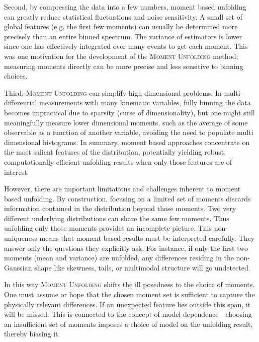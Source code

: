 {{        Second, by compressing the data into a few numbers, moment based unfolding can greatly reduce statistical fluctuations and noise sensitivity.
        A small set of global features (e.g. the first few moments) can usually be determined more precisely than an entire binned spectrum.
        The variance of estimators is lower since one has effectively integrated over many events to get each moment.
        This was one motivation for the development of the \textsc{Moment Unfolding} method;
        measuring moments directly can be more precise and less sensitive to binning choices.
        
        Third, \textsc{Moment Unfolding} can simplify high dimensional problems.
        In multi-differential measurements with many kinematic variables, fully binning the data becomes impractical due to sparsity (curse of dimensionality), but one might still meaningfully measure lower dimensional moments, such as the average of some observable as a function of another variable, avoiding the need to populate multi dimensional histograms.
        In summary, moment based approaches concentrate on the most salient features of the distribution, potentially yielding robust, computationally efficient unfolding results when only those features are of interest.

        However, there are important limitations and challenges inherent to moment based unfolding.
        By construction, focusing on a limited set of moments discards information contained in the distribution beyond those moments.
        Two very different underlying distributions can share the same few moments.
        Thus unfolding only those moments provides an incomplete picture.
        This non-uniqueness means that moment based results must be interpreted carefully.
        They answer only the questions they explicitly ask.
        For instance, if only the first two moments (mean and variance) are unfolded, any differences residing in the non-Gaussian shape like skewness, tails, or multimodal structure will go undetected.
        
        In this way \textsc{Moment Unfolding} shifts the ill posedness to the choice of moments.
        One must assume or hope that the chosen moment set is sufficient to capture the physically relevant differences.
        If an unexpected feature lies outside this span, it will be missed.
        This is connected to the concept of model dependence---choosing an insufficient set of moments imposes a choice of model on the unfolding result, thereby biasing it.

}}
